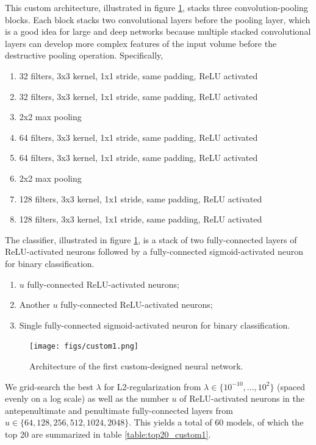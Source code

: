 This custom architecture, illustrated in figure \ref{fig:custom1}, stacks three convolution-pooling blocks. Each block stacks two convolutional layers before the pooling layer, which is a good idea for large and deep networks because multiple stacked convolutional layers can develop more complex features of the input volume before the destructive pooling operation. Specifically,

\begin{enumerate}
    \item 32 filters, 3x3 kernel, 1x1 stride, same padding, ReLU activated
    \item 32 filters, 3x3 kernel, 1x1 stride, same padding, ReLU activated
    \item 2x2 max pooling
    \item 64 filters, 3x3 kernel, 1x1 stride, same padding, ReLU activated
    \item 64 filters, 3x3 kernel, 1x1 stride, same padding, ReLU activated
    \item 2x2 max pooling
    \item 128 filters, 3x3 kernel, 1x1 stride, same padding, ReLU activated
    \item 128 filters, 3x3 kernel, 1x1 stride, same padding, ReLU activated
\end{enumerate}

The classifier, illustrated in figure \ref{fig:custom1}, is a stack of two fully-connected layers of ReLU-activated neurons followed by a fully-connected sigmoid-activated neuron for binary classification.

\begin{enumerate}
    \item $u$ fully-connected ReLU-activated neurons;
    \item Another $u$ fully-connected ReLU-activated neurons;
    \item Single fully-connected sigmoid-activated neuron for binary classification.
\end{enumerate}

\begin{figure}[ht]
    \centering
    \texttt{[image: figs/custom1.png]}
    \caption{Architecture of the first custom-designed neural network.}
    \label{fig:custom1}
\end{figure}


We grid-search the best $\lambda$ for L2-regularization from $\lambda \in \{10^{-10}, ..., 10^{2}\}$ (spaced evenly on a log scale) as well as the number $u$ of ReLU-activated neurons in the antepenultimate and penultimate fully-connected layers from $u \in \{ 64, 128, 256, 512, 1024, 2048 \}$. This yields a total of $60$ models, of which the top 20 are summarized in table \ref{table:top20_custom1}.

